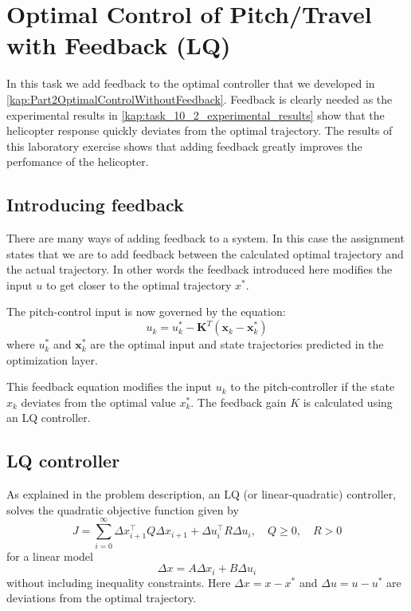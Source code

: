 \documentclass[../main.tex]{subfiles}
\begin{document}
	
\section{Optimal Control of Pitch/Travel with Feedback (LQ)}
In this task we add feedback to the optimal controller that we developed in \cref{kap:Part2OptimalControlWithoutFeedback}. Feedback is clearly needed as the experimental results in \cref{kap:task_10_2_experimental_results} show that the helicopter response quickly deviates from the optimal trajectory. The results of this laboratory exercise shows that adding feedback greatly improves the perfomance of the helicopter.

\subsection{Introducing feedback}
There are many ways of adding feedback to a system. In this case the assignment states that we are to add feedback between the calculated optimal trajectory and the actual trajectory. In other words the feedback introduced here modifies the input $u$ to get closer to the optimal trajectory $x^*$.

The pitch-control input is now governed by the equation:
\begin{equation}\label{eq:lab3_feedback}
	u_k = u_k^* - \bm{K}^T(\bm x_k - \bm x_k^*)
\end{equation}
where $u_k^*$ and $\bm x_k^*$ are the optimal input and state trajectories predicted in the optimization layer.

This feedback equation modifies the input $u_k$ to the pitch-controller if the state $x_k$ deviates from the optimal value $x_k^*$. The feedback gain $K$ is calculated using an LQ controller.

\subsection{LQ controller}\label{kap:task_10_3_LQ_controller}
As explained in the problem description, an LQ (or linear-quadratic) controller, solves the quadratic objective function given by
\begin{equation}
    J = \sum^\infty_{i=0} \Delta x_{i+1}^\top Q \Delta x_{i+1} + \Delta u_i^\top R \Delta u_i, \quad Q \ge0, \quad R > 0
\end{equation}
for a linear model
\begin{equation}\label{eq:lab3_lin_model}
	\Delta x=A\Delta x_i + B \Delta u_i
\end{equation}
without including inequality constraints.
Here $ \Delta x = x - x^*$ and $\Delta u = u - u^*$ are deviations from the optimal trajectory.
\end{document}
